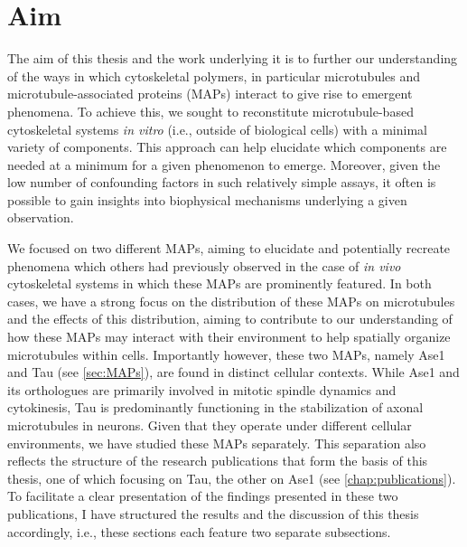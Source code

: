 \chapter{Aim}
The aim of this thesis and the work underlying it is to further our understanding of the ways in which cytoskeletal polymers, in particular microtubules and microtubule-associated proteins (MAPs) interact to give rise to emergent phenomena. To achieve this, we sought to reconstitute microtubule-based cytoskeletal systems \textit{in vitro} (i.e., outside of biological cells) with a minimal variety of components. This approach can help elucidate which components are needed at a minimum for a given phenomenon to emerge. Moreover, given the low number of confounding factors in such relatively simple assays, it often is possible to gain insights into biophysical mechanisms underlying a given observation. \par
We focused on two different MAPs, aiming to elucidate and potentially recreate phenomena which others had previously observed in the case of \textit{in vivo} cytoskeletal systems in which these MAPs are prominently featured. In both cases, we have a strong focus on the distribution of these MAPs on microtubules and the effects of this distribution, aiming to contribute to our understanding of how these MAPs may interact with their environment to help spatially organize microtubules within cells. Importantly however, these two MAPs, namely Ase1 and Tau (see \autoref{sec:MAPs}), are found in distinct cellular contexts. While Ase1 and its orthologues are primarily involved in mitotic spindle dynamics and cytokinesis, Tau is predominantly functioning in the stabilization of axonal microtubules in neurons. Given that they operate under different cellular environments, we have studied these MAPs separately. This separation also reflects the structure of the research publications that form the basis of this thesis, one of which focusing on Tau, the other on Ase1 (see \autoref{chap:publications}). To facilitate a clear presentation of the findings presented in these two publications, I have structured the results and the discussion of this thesis accordingly, i.e., these sections each feature two separate subsections.